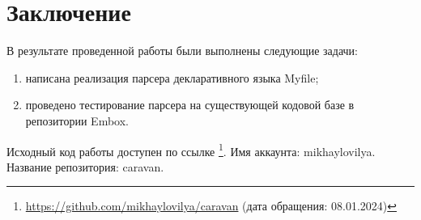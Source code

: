 
\section*{Заключение}




В результате проведенной работы были выполнены следующие задачи:
\begin{enumerate}
	\item написана реализация парсера декларативного языка Myfile;
	\item проведено тестирование парсера на существующей кодовой базе в репозитории Embox.
\end{enumerate}

Исходный код работы доступен по ссылке \footnote{\href{https://github.com/mikhaylovilya/caravan}{https://github.com/mikhaylovilya/caravan} (дата обращения: 08.01.2024)}.
Имя аккаунта: mikhaylovilya. Название репозитория: caravan.

